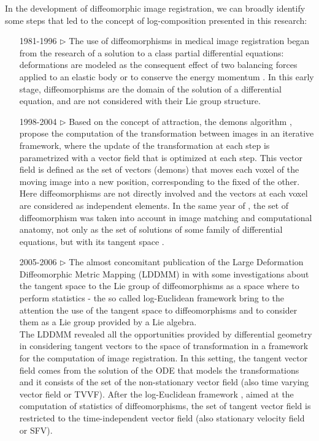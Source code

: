 In the development of diffeomorphic image registration, we can broadly identify some steps that led to the concept of log-composition presented in this research:
\begin{enumerate}
	\item[1981-1996 $\triangleright$] The use of diffeomorphisms in medical image registration began from the research of a solution to a class partial differential equations: deformations are modeled as the consequent effect of two balancing forces applied to an elastic body \cite{Broit:1981} or to conserve the energy momentum \cite{christensen1996deformable}. In this early stage, diffeomorphisms are the domain of the solution of a differential equation, and are not considered with their Lie group structure.
	\item[1998-2004 $\triangleright$] Based on the concept of attraction, the demons algorithm \cite{thirion1998image}, \cite{pennec1999understanding} propose the computation of the transformation between images in an iterative framework, where the update of the transformation at each step is parametrized with a vector field that is optimized at each step. This vector field is defined as the set of vectors (demons) that moves each voxel of the moving image into a new position, corresponding to the fixed of the other. \\
	Here diffeomorphisms are not directly involved and the vectors at each voxel are considered as independent elements. 
	In the same year of \cite{thirion1998image}, the set of diffeomorphism was taken into account in image matching and computational anatomy, not only as the set of solutions of some family of differential equations, but with its tangent space \cite{Dupuis:98:variationalproblems,  trouve1998diffeomorphisms, grenander1998computational}.
	\item[2005-2006 $\triangleright$] The almost concomitant publication of the Large Deformation Diffeomorphic Metric Mapping (LDDMM) in \cite{beg2005computing} with some investigations about the tangent space to the Lie group of diffeomorphisms as a space where to perform statistics - the so called log-Euclidean framework \cite{arsigny2006statistics, Arsigny:MRM:06} 
	bring to the attention the use of the tangent space to diffeomorphisms and to consider them as a Lie group provided by a Lie algebra.\\
	The LDDMM revealed all the opportunities provided by differential geometry in considering tangent vectors to the space of transformation in a framework for the computation of image registration. In this setting, the tangent vector field comes from the solution of the ODE that models the transformations and it consists of the set of the non-stationary vector field (also time varying vector field or TVVF). After the log-Euclidean framework \cite{arsigny2006statistics}, aimed at the computation of statistics of diffeomorphisms, the set of tangent vector field is restricted to the time-independent vector field (also stationary velocity field or SFV).

\end{enumerate}
